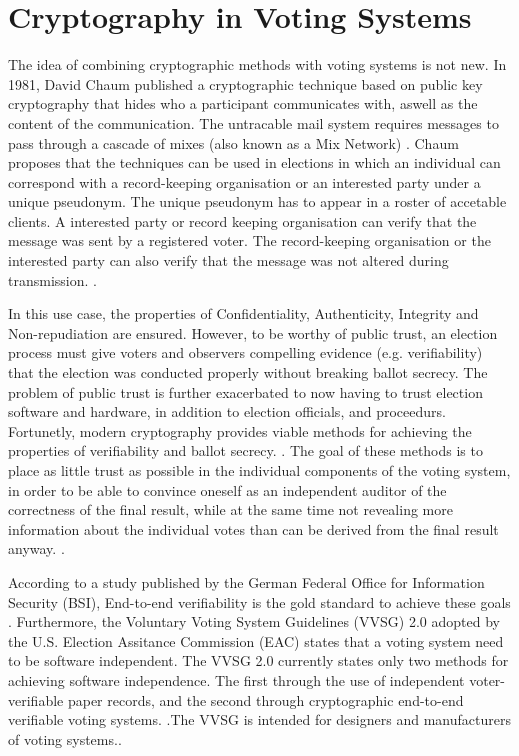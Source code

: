 \section{Cryptography in Voting Systems}
The idea of combining cryptographic methods with voting systems is not new. In 1981, David Chaum published a cryptographic technique based on public key cryptography that hides who a participant communicates with, aswell as the content of the communication. The untracable mail system requires messages to pass through a cascade of mixes (also known as a Mix Network) \cite[86]{chaum}. Chaum proposes that the techniques can be used in elections in which an individual can correspond with a record-keeping organisation or an interested party under a unique pseudonym. The unique pseudonym has to appear in a roster of accetable clients. A interested party or record keeping organisation can verify that the message was sent by a registered voter. The record-keeping organisation or the interested party can also verify that the message was not altered during transmission. \cite[84]{chaum}. 

In this use case, the properties of Confidentiality, Authenticity, Integrity and Non-repudiation are ensured. However, to be worthy of public trust, an election process must give voters and observers compelling evidence (e.g. verifiability) that the election was conducted properly without breaking ballot secrecy. The problem of public trust is further exacerbated to now having to trust election software and hardware, in addition to election officials, and proceedurs. Fortunetly, modern cryptography provides viable methods for achieving the properties of verifiability and ballot secrecy. \cite[6]{onlinee-2e-study}. The goal of these methods is to place as little trust as possible in the individual components of the voting system, in order to be able to convince oneself as an independent auditor of the correctness of the final result, while at the same time not revealing more information about the individual votes than can be derived from the final result anyway. \cite[6, 10]{onlinee-2e-study}.

According to a study published by the German Federal Office for Information Security (BSI), End-to-end verifiability is the gold standard to achieve these goals \cite[10]{onlinee-2e-study}. Furthermore, the Voluntary Voting System Guidelines (VVSG) 2.0 adopted by the U.S. Election Assitance Commission (EAC) states that a voting system need to be software independent. The VVSG 2.0 currently states only two methods for achieving software independence. The first through the use of independent voter-verifiable paper records, and the second through cryptographic end-to-end verifiable voting systems. \cite[181]{vvsg}.The VVSG is intended for designers and manufacturers of voting systems.\cite{vvsg-intro}.


